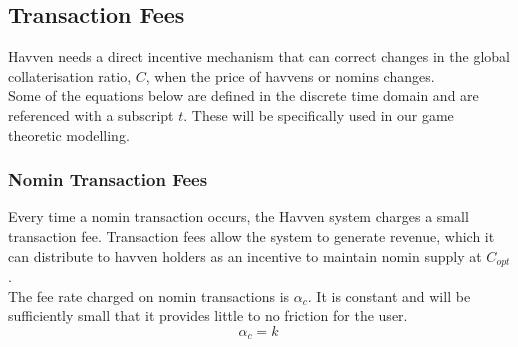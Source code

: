 


\newpage
\subsection{Transaction Fees} Havven needs a direct incentive mechanism that can correct changes in the global collaterisation ratio, $C$, when the price of havvens or nomins changes. \\

\noindent Some of the equations below are defined in the discrete time domain and are referenced with a subscript $t$. These will be specifically used in our game theoretic modelling.

\subsubsection{Nomin Transaction Fees} Every time a nomin transaction occurs, the Havven system charges a small transaction fee. Transaction fees allow the system to generate revenue, which it can distribute to havven holders as an incentive to maintain nomin supply at $C_{opt}$. \\

\noindent The fee rate charged on nomin transactions is $\alpha_c$. It is constant and will be sufficiently small that it provides little to no friction for the user.\\

\begin{equation}
\alpha_c = k \ \label{eq:5}
\end{equation}

\begin{center}
\end{center}

